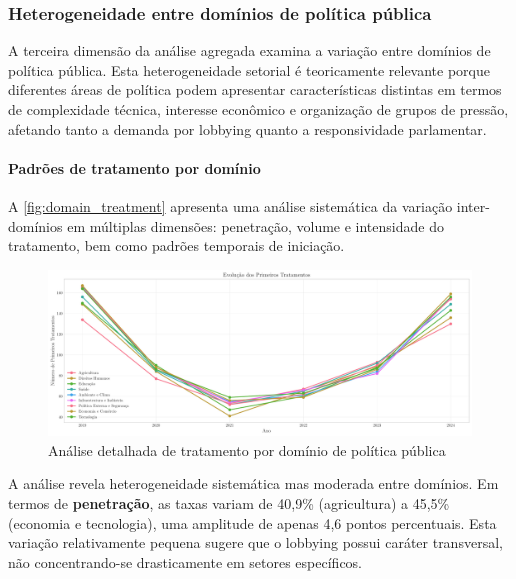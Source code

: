 \subsubsection{Heterogeneidade entre domínios de política pública}

A terceira dimensão da análise agregada examina a variação entre domínios de política pública. Esta heterogeneidade setorial é teoricamente relevante porque diferentes áreas de política podem apresentar características distintas em termos de complexidade técnica, interesse econômico e organização de grupos de pressão, afetando tanto a demanda por lobbying quanto a responsividade parlamentar.

\paragraph{Padrões de tratamento por domínio}

A \autoref{fig:domain_treatment} apresenta uma análise sistemática da variação inter-domínios em múltiplas dimensões: penetração, volume e intensidade do tratamento, bem como padrões temporais de iniciação.

\begin{figure}[htbp]
\centering
\includegraphics[width=\textwidth]{figures/fig7_domain_treatment_analysis.pdf}
\caption{Análise detalhada de tratamento por domínio de política pública}
\label{fig:domain_treatment}
\end{figure}

A análise revela heterogeneidade sistemática mas moderada entre domínios. Em termos de \textbf{penetração}, as taxas variam de 40,9\% (agricultura) a 45,5\% (economia e tecnologia), uma amplitude de apenas 4,6 pontos percentuais. Esta variação relativamente pequena sugere que o lobbying possui caráter transversal, não concentrando-se drasticamente em setores específicos.

